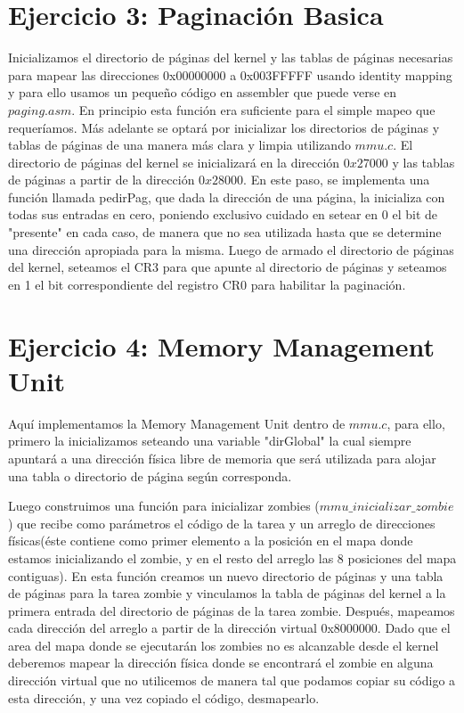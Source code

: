 \documentclass[a4paper]{article}
\begin{document}
\section{Ejercicio 3: Paginación Basica}
%

Inicializamos el directorio de páginas del kernel y las tablas de páginas necesarias para mapear las direcciones 0x00000000 a 0x003FFFFF usando identity mapping y para ello usamos un pequeño código en assembler que puede verse en $paging.asm$. En principio esta función era suficiente para el simple mapeo que requeríamos. Más adelante se optará por inicializar los directorios de páginas y tablas de páginas de una manera más clara y limpia utilizando $mmu.c$. El directorio de páginas del kernel se inicializará en la dirección $0x27000$ y las tablas de páginas a partir de la dirección $0x28000$. En este paso, se implementa una función llamada pedirPag, que dada la dirección de una página, la inicializa con todas sus entradas en cero, poniendo exclusivo cuidado en setear en 0 el bit de "presente" en cada caso, de manera que no sea utilizada hasta que se determine una dirección apropiada para la misma. 
Luego de armado el directorio de páginas del kernel, seteamos el CR3 para que apunte al directorio de páginas y seteamos en 1 el bit correspondiente del registro CR0 para habilitar la paginación.

\section{Ejercicio 4: Memory Management Unit}
%

Aquí implementamos la Memory Management Unit dentro de $mmu.c$, para ello, primero la inicializamos seteando una variable "dirGlobal" la cual siempre apuntará a una dirección física libre de memoria que será utilizada para alojar una tabla o directorio de página según corresponda.

Luego construimos una función para inicializar zombies ($mmu\_ inicializar\_ zombie$) que recibe como parámetros el código de la tarea y un arreglo de direcciones físicas(éste contiene como primer elemento a la posición en el mapa donde estamos inicializando el zombie, y en el resto del arreglo las 8 posiciones del mapa contiguas). En esta función creamos un nuevo directorio de páginas y una tabla de páginas para la tarea zombie y vinculamos la tabla de páginas del kernel a la primera entrada del directorio de páginas de la tarea zombie. Después, mapeamos cada dirección del arreglo a partir de la dirección virtual 0x8000000. 
Dado que el area del mapa donde se ejecutarán los zombies no es alcanzable desde el kernel deberemos mapear la dirección física donde se encontrará el zombie en alguna dirección virtual que no utilicemos de manera tal que podamos copiar su código a esta dirección, y una vez copiado el código, desmapearlo.
\end{document}

